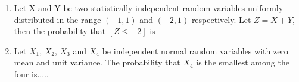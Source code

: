 \begin{enumerate}[label=\thesection.\arabic*.,ref=\thesection.\theenumi]
\begin{enumerate}
\end{enumerate}
%
\solution

%
\item Let X and Y be two statistically independent random variables uniformly distributed in the range $(-1,1)$ and $(-2,1)$ respectively. Let $Z = X+Y$, then the probability that $[Z\leqslant-2]$ is
\begin{enumerate}
\end{enumerate}
%
\solution



%
\item Let $X_1$, $X_2$, $X_3$ and $X_4$ be independent normal random variables with zero mean and unit variance. The probability that $X_4$ is the smallest among the four is..... 
\\
\solution



\end{enumerate}
